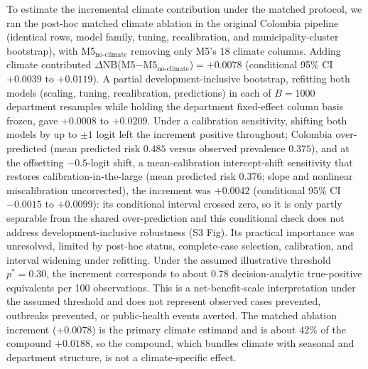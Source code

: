 \documentclass[11pt,a4paper]{article}
\begin{document}
To estimate the incremental climate contribution under the matched protocol, we ran the post-hoc matched climate ablation in the original Colombia pipeline (identical rows, model family, tuning, recalibration, and municipality-cluster bootstrap), with M5$_{\text{no-climate}}$ removing only M5's 18 climate columns. Adding climate contributed $\Delta$NB(M5$-$M5$_{\text{no-climate}}$)$=+0.0078$ (conditional 95\% CI $+0.0039$ to $+0.0119$). A partial development-inclusive bootstrap, refitting both models (scaling, tuning, recalibration, predictions) in each of $B=1000$ department resamples while holding the department fixed-effect column basis frozen, gave $+0.0008$ to $+0.0209$. Under a calibration sensitivity, shifting both models by up to $\pm 1$ logit left the increment positive throughout; Colombia over-predicted (mean predicted risk $0.485$ versus observed prevalence $0.375$), and at the offsetting $-0.5$-logit shift, a mean-calibration intercept-shift sensitivity that restores calibration-in-the-large (mean predicted risk $0.376$; slope and nonlinear miscalibration uncorrected), the increment was $+0.0042$ (conditional 95\% CI $-0.0015$ to $+0.0099$): its conditional interval crossed zero, so it is only partly separable from the shared over-prediction and this conditional check does not address development-inclusive robustness (S3 Fig). Its practical importance was unresolved, limited by post-hoc status, complete-case selection, calibration, and interval widening under refitting. Under the assumed illustrative threshold $p^*=0.30$, the increment corresponds to about $0.78$ decision-analytic true-positive equivalents per 100 observations. This is a net-benefit-scale interpretation under the assumed threshold and does not represent observed cases prevented, outbreaks prevented, or public-health events averted. The matched ablation increment ($+0.0078$) is the primary climate estimand and is about $42\%$ of the compound $+0.0188$, so the compound, which bundles climate with seasonal and department structure, is not a climate-specific effect.
\end{document}
